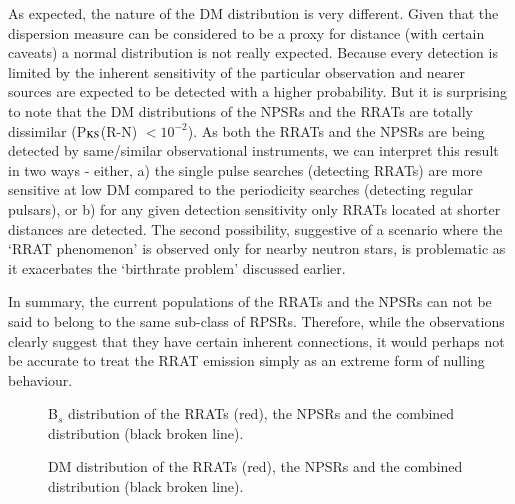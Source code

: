 \documentclass{jaa}
\newcommand{\bef}{\begin{figure}}
\newcommand{\eef}{\end{figure}}
\begin{document}
As expected, the nature of the DM distribution is very different. Given
that  the dispersion  measure  can be  considered to  be  a proxy  for
distance (with  certain caveats) a  normal distribution is  not really
expected.   Because  every  detection   is  limited  by  the  inherent
sensitivity  of  the particular  observation  and  nearer sources  are
expected  to  be  detected  with  a higher  probability.   But  it  is
surprising to note that the DM distributions of the NPSRs and the RRATs
are totally  dissimilar (P$_{\rm KS}$(R-N)  $< 10^{-2}$). As  both the
RRATs and the  NPSRs are being detected  by same/similar observational
instruments, we can interpret this result in two ways - either, a) the
single pulse searches  (detecting RRATs) are more sensitive  at low DM
compared to  the periodicity searches (detecting  regular pulsars), or
b) for any  given detection sensitivity only RRATs  located at shorter
distances  are  detected.  The  second possibility,  suggestive  of  a
scenario  where the  `RRAT  phenomenon' is  observed  only for  nearby
neutron  stars,  is  problematic  as  it  exacerbates  the  `birthrate
problem' discussed earlier.

In summary, the current populations of the RRATs and the NPSRs can not
be said to belong to the same sub-class of RPSRs. Therefore, while the
observations  clearly   suggest  that   they  have   certain  inherent
connections,  it would  perhaps  not  be accurate  to  treat the  RRAT
emission simply as an extreme form of nulling behaviour.

%
\bef
%
%
\caption{B$_s$  distribution of  the RRATs  (red), the  NPSRs and  the
  combined distribution (black broken line). }
%
\label{f_Bhst} 
%
\eef
%

%
\bef
%
%
\caption{DM  distribution  of  the  RRATs (red),  the  NPSRs  and  the
  combined distribution (black broken line). }
%
\label{f_Dhst} 
%
\eef
%
\end{document}
